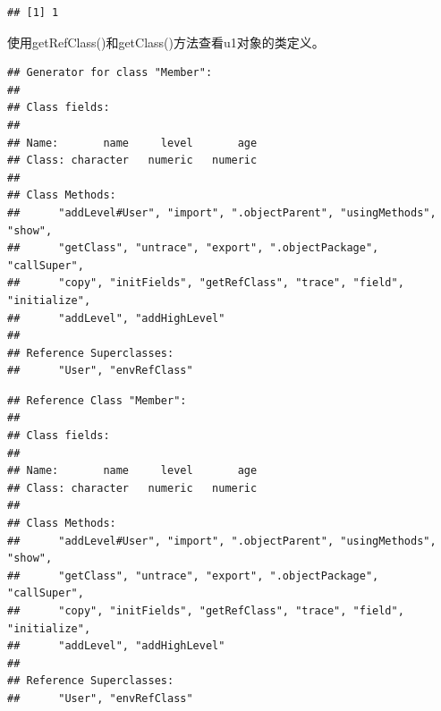 \documentclass[]{book}
\newenvironment{Shaded}{\begin{snugshade}}{\end{snugshade}}
\newcommand{\KeywordTok}[1]{\textcolor[rgb]{0.13,0.29,0.53}{\textbf{#1}}}
\newcommand{\CommentTok}[1]{\textcolor[rgb]{0.56,0.35,0.01}{\textit{#1}}}
\newcommand{\OperatorTok}[1]{\textcolor[rgb]{0.81,0.36,0.00}{\textbf{#1}}}
\newcommand{\NormalTok}[1]{#1}
\begin{document}
\begin{verbatim}
## [1] 1
\end{verbatim}

使用getRefClass()和getClass()方法查看u1对象的类定义。

\begin{Shaded}
\end{Shaded}

\begin{verbatim}
## Generator for class "Member":
## 
## Class fields:
##                                     
## Name:       name     level       age
## Class: character   numeric   numeric
## 
## Class Methods: 
##      "addLevel#User", "import", ".objectParent", "usingMethods", "show", 
##      "getClass", "untrace", "export", ".objectPackage", "callSuper", 
##      "copy", "initFields", "getRefClass", "trace", "field", "initialize", 
##      "addLevel", "addHighLevel"
## 
## Reference Superclasses: 
##      "User", "envRefClass"
\end{verbatim}

\begin{Shaded}
\end{Shaded}

\begin{verbatim}
## Reference Class "Member":
## 
## Class fields:
##                                     
## Name:       name     level       age
## Class: character   numeric   numeric
## 
## Class Methods: 
##      "addLevel#User", "import", ".objectParent", "usingMethods", "show", 
##      "getClass", "untrace", "export", ".objectPackage", "callSuper", 
##      "copy", "initFields", "getRefClass", "trace", "field", "initialize", 
##      "addLevel", "addHighLevel"
## 
## Reference Superclasses: 
##      "User", "envRefClass"
\end{verbatim}

\begin{Shaded}
\end{Shaded}
\end{document}
